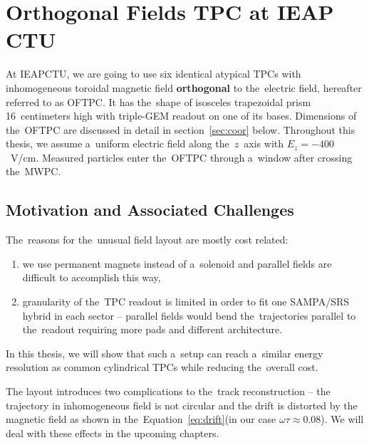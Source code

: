 	\section{Orthogonal Fields TPC at IEAP CTU}
	\label{sec:oftpc}
		At \ac{IEAPCTU}, we are going to use six identical atypical \acp{TPC} with inhomogeneous toroidal magnetic field \textbf{orthogonal} to the~electric field, hereafter referred to as \acf{OFTPC}. It has the~shape of isosceles trapezoidal prism 16~centimeters high with triple\nobreakdash-\ac{GEM} readout on one of its bases. Dimensions of the~\ac{OFTPC} are discussed in detail in section~\ref{sec:coor} below. Throughout this thesis, we assume a~uniform electric field along the~$z$~axis with $E_z = -400$~V/cm. Measured particles enter the~\ac{OFTPC} through a~window after crossing the~\ac{MWPC}.
		
		
		\subsection{Motivation and Associated Challenges}
			The~reasons for the~unusual field layout are mostly cost related:
				\begin{enumerate}[nosep,label=\alph*)]
					\item we use permanent magnets instead of a~solenoid and parallel fields are difficult to accomplish this way,
					\item granularity of the~\ac{TPC} readout is limited in order to fit one SAMPA/SRS hybrid in each sector -- parallel fields would bend the~trajectories parallel to the~readout requiring more pads and different architecture.
				\end{enumerate}
			In this thesis, we will show that such a~setup can reach a~similar energy resolution as common cylindrical \acp{TPC} while reducing the~overall cost.
			
			The layout introduces two complications to the~track reconstruction -- the trajectory in inhomogeneous field is not circular and the drift is distorted by the magnetic field as shown in the~Equation~\ref{eq:drift}(in our case $\omega\tau \approx 0.08$). We will deal with these effects in the upcoming chapters.
			
